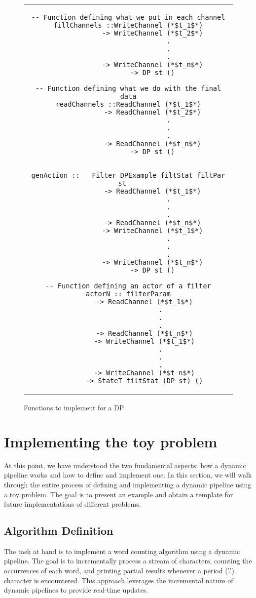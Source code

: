 \begin{figure}[H]
    \begin{tabular}{c}
        \begin{lstlisting}
-- Function defining what we put in each channel
fillChannels ::WriteChannel (*$t_1$*)
            -> WriteChannel (*$t_2$*)
                    .
                    .
                    .
            -> WriteChannel (*$t_n$*)
            -> DP st ()

-- Function defining what we do with the final data
readChannels ::ReadChannel (*$t_1$*)
            -> ReadChannel (*$t_2$*)
                    .
                    .
                    .
            -> ReadChannel (*$t_n$*)
            -> DP st ()


genAction ::   Filter DPExample filtStat filtPar st   
            -> ReadChannel (*$t_1$*)
                    .
                    .
                    .
            -> ReadChannel (*$t_n$*)
            -> WriteChannel (*$t_1$*)
                    .
                    .
                    .
            -> WriteChannel (*$t_n$*)
            -> DP st ()

-- Function defining an actor of a filter
actorN :: filterParam
        -> ReadChannel (*$t_1$*)
                .
                .
                .
        -> ReadChannel (*$t_n$*)
        -> WriteChannel (*$t_1$*)
                .
                .
                .
        -> WriteChannel (*$t_n$*)
        -> StateT filtStat (DP st) ()
        \end{lstlisting}
    \end{tabular}
    \caption[{[Code]}Functions summary]{Functions to implement for a DP}
    \label{fig:HC15}
\end{figure}

\section{Implementing the toy problem}
At this point, we have understood the two fundamental aspects: how a dynamic pipeline works and how to define and implement one.
In this section, we will walk through the entire process of defining and implementing a dynamic pipeline using a toy problem.
The goal is to present an example and obtain a template for future implementations of different problems.
\subsection{Algorithm Definition}
The task at hand is to implement a word counting algorithm using a dynamic pipeline.
The goal is to incrementally process a stream of characters, counting the occurrences of each word, and printing partial results whenever a period ('.') character is encountered.
This approach leverages the incremental nature of dynamic pipelines to provide real-time updates. \\


